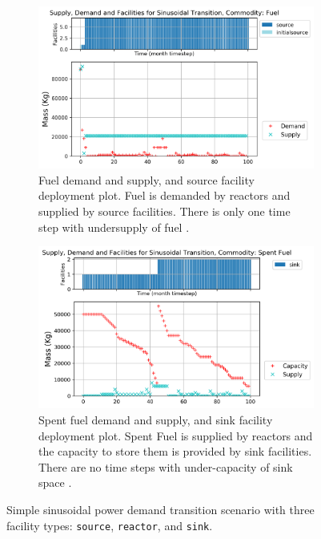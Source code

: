     \begin{figure}[]
        \centering
        \begin{subfigure}[t]{\textwidth}
            \centering
            \includegraphics[width=0.9\linewidth]{figures/sinetransition-fuel.png} 
            \caption{Fuel demand and supply, and source facility deployment plot.
            Fuel is demanded by reactors and supplied by source facilities.
            There is only one time step with undersupply of fuel \cite{chee_arfc/transition-scenarios_2018}.}
            \label{fig:sinetransition-fuel}
        \end{subfigure}
        \begin{subfigure}[t]{\textwidth}
            \centering
            \includegraphics[width=0.9\linewidth]{figures/sinetransition-spentfuel.png} 
            \caption{Spent fuel demand and supply, and sink facility deployment plot.
                Spent Fuel is supplied by reactors and the capacity to store them 
                is provided by sink facilities.
            There are no time steps with under-capacity of sink space \cite{chee_arfc/transition-scenarios_2018}.}
            \label{fig:sinetransition-spentfuel}
        \end{subfigure}
        \caption{Simple sinusoidal power demand transition scenario with 
        three facility types: \texttt{source}, \texttt{reactor}, and \texttt{sink}.}
    \end{figure}

